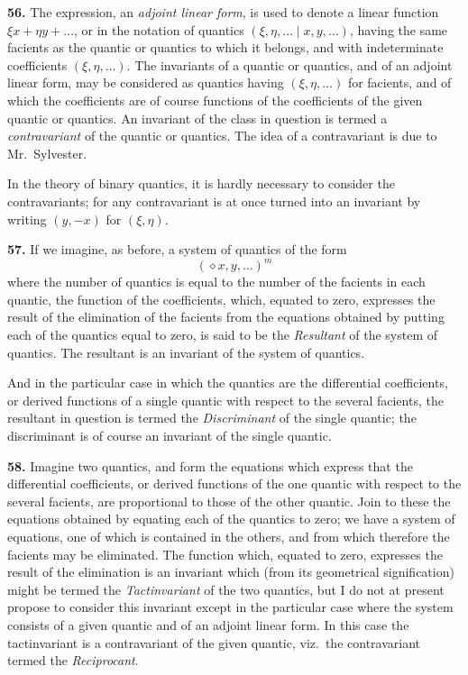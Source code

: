 \documentclass[11pt]{article}
\begin{document}
\medskip

\noindent\textbf{56.} The expression, an \textit{adjoint linear form}, is used to denote a linear function
$\xi x + \eta y + \ldots$, or in the notation of quantics $(\xi, \eta, \ldots \mid x, y, \ldots)$, having the same facients as the quantic or quantics to which it belongs, and with indeterminate coefficients $(\xi, \eta, \ldots)$. The invariants of a quantic or quantics, and of an adjoint linear form, may be considered as quantics having $(\xi, \eta, \ldots)$ for facients, and of which the coefficients are of course functions of the coefficients of the given quantic or quantics. An invariant of the class in question is termed a \textit{contravariant} of the quantic or quantics. The idea of a contravariant is due to Mr.\ Sylvester.

\medskip

In the theory of binary quantics, it is hardly necessary to consider the contravariants; for any contravariant is at once turned into an invariant by writing $(y, -x)$ for $(\xi, \eta)$.

\medskip

\noindent\textbf{57.} If we imagine, as before, a system of quantics of the form
\[
(\diamond x, y, \ldots)^m
\]
where the number of quantics is equal to the number of the facients in each quantic, the function of the coefficients, which, equated to zero, expresses the result of the elimination of the facients from the equations obtained by putting each of the quantics equal to zero, is said to be the \textit{Resultant} of the system of quantics. The resultant is an invariant of the system of quantics.

\medskip

And in the particular case in which the quantics are the differential coefficients, or derived functions of a single quantic with respect to the several facients, the resultant in question is termed the \textit{Discriminant} of the single quantic; the discriminant is of course an invariant of the single quantic.

\medskip

\noindent\textbf{58.} Imagine two quantics, and form the equations which express that the differential coefficients, or derived functions of the one quantic with respect to the several facients, are proportional to those of the other quantic. Join to these the equations obtained by equating each of the quantics to zero; we have a system of equations, one of which is contained in the others, and from which therefore the facients may be eliminated. The function which, equated to zero, expresses the result of the elimination is an invariant which (from its geometrical signification) might be termed the \textit{Tactinvariant} of the two quantics, but I do not at present propose to consider this invariant except in the particular case where the system consists of a given quantic and of an adjoint linear form. In this case the tactinvariant is a contravariant of the given quantic, viz.\ the contravariant termed the \textit{Reciprocant}.
\end{document}
